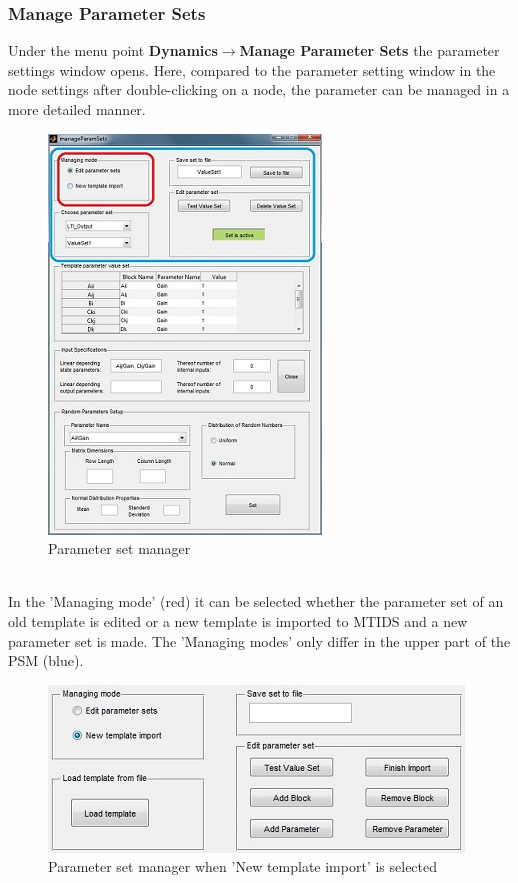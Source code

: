\documentclass[12pt]{report}
\begin{document}
\subsubsection{Manage Parameter Sets}
Under the menu point \textbf{Dynamics$\rightarrow$Manage Parameter Sets} the parameter settings window opens. Here, compared to the parameter setting window in the node settings after double-clicking on a node, the parameter can be managed in a more detailed manner.\\
\begin{figure}
\centering
\includegraphics[scale=.7]{manageparaset2}
\caption{Parameter set manager}
\label{FIG:abb13}
\end{figure}
\\
In the 'Managing mode' (red) it can be selected whether the parameter set of an old template is edited or a new template is imported to MTIDS and a new parameter set is made. The 'Managing modes' only differ in the upper part of the PSM (blue).\\
\begin{figure}[h]
\centering
\includegraphics[scale=.8]{mode2}
\caption{Parameter set manager when 'New template import' is selected}
\label{FIG:abb14}
\end{figure}
\end{document}
